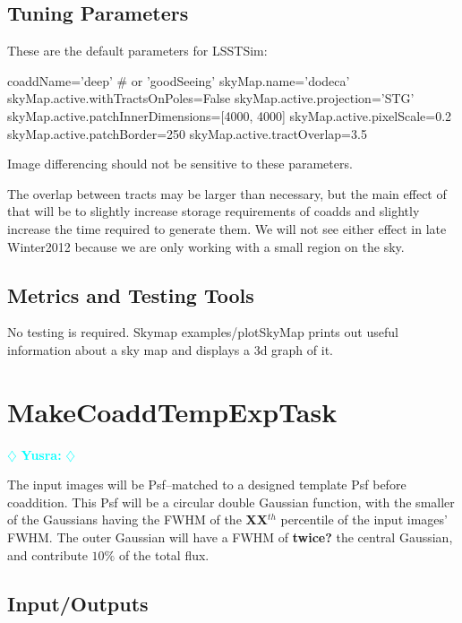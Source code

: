 \documentclass[12pt]{article}
\newcommand{\yusra} { \textcolor{cyan} {
\ensuremath{\diamondsuit} {\bf Yusra:}  
\ensuremath{\diamondsuit} } }
\begin{document}
\subsection{Tuning Parameters}

These are the default parameters for LSSTSim:

\begin{python}
coaddName='deep' # or 'goodSeeing'
skyMap.name='dodeca'
skyMap.active.withTractsOnPoles=False
skyMap.active.projection='STG'
skyMap.active.patchInnerDimensions=[4000, 4000]
skyMap.active.pixelScale=0.2
skyMap.active.patchBorder=250
skyMap.active.tractOverlap=3.5
\end{python}

Image differencing should not be sensitive to these parameters.

The overlap between tracts may be larger than necessary, but the main effect of that
will be to slightly increase storage requirements of coadds and slightly increase
the time required to generate them. We will not see either effect in late Winter2012
because we are only working with a small region on the sky.

\subsection{Metrics and Testing Tools}

No testing is required.  Skymap examples/plotSkyMap prints out useful
information about a sky map and displays a 3d graph of it.


\clearpage 
\section{MakeCoaddTempExpTask} \yusra

The input images will be Psf--matched to a designed template Psf
before coaddition.  This Psf will be a circular double Gaussian
function, with the smaller of the Gaussians having the FWHM of the
{\bf XX}$^{th}$ percentile of the input images' FWHM.  The outer
Gaussian will have a FWHM of {\bf twice?} the central Gaussian, and
contribute {\bf $10\%$} of the total flux.

\subsection{Input/Outputs}
\end{document}
